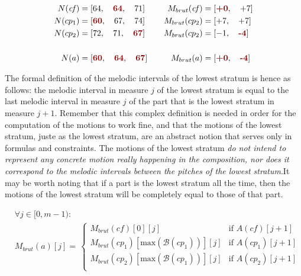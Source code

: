 \begin{equation}
    \begin{aligned}        
    N(\mathit{cf}) &= [64,\quad  \textcolor{darkred}{\textbf{64}},\quad  71] \quad 
    &M_{brut}(\mathit{cf}) &= [\textcolor{darkred}{\textbf{+0}}, \quad +7]\\
    N(cp_1) &= [\textcolor{darkred}{\textbf{60}},\quad  67,\quad  74] \quad 
    &M_{brut}(cp_2) &= [+7, \quad +7]\\
    N(cp_2) &= [72,\quad  71,\quad  \textcolor{darkred}{\textbf{67}}] \quad 
    &M_{brut}(cp_2) &= [-1, \quad \textcolor{darkred}{\textbf{-4}}]\\
    \\
    N(a) &= [\textcolor{darkred}{\textbf{60}},\quad  \textcolor{darkred}{\textbf{64}},\quad  \textcolor{darkred}{\textbf{67}}] \quad 
    &M_{brut}(a) &= [\textcolor{darkred}{\textbf{+0}}, \quad \textcolor{darkred}{\textbf{-4}}]\\
\end{aligned}
\label{eq:defining-m-intervals-bass}
\end{equation}


The formal definition of the melodic intervals of the lowest stratum is hence as follows: the melodic interval in measure $j$ of the lowest stratum is equal to the last melodic interval in measure $j$ of the part that is the lowest stratum in measure $j+1$. Remember that this complex definition is needed in order for the computation of the motions to work fine, and that the motions of the lowest stratum, juste as the lowest stratum, are an abstract notion that serves only in formulas and constraints. The motions of the lowest stratum \textit{do not intend to represent any concrete motion really happening in the composition, nor does it correspond to the melodic intervals between the pitches of the lowest stratum}.It may be worth noting that if a part is the lowest stratum all the time, then the motions of the lowest stratum will be completely equal to those of that part.

\begin{equation}
    \begin{aligned}
        &\forall j \in [0, m-1):\\
        &M_{brut}(a)[j] = \,  
        \begin{cases}
            M_{brut}(\mathit{cf})[0][j] & \text{if } A(\mathit{cf})[j+1]\\
            M_{brut}(cp_1)[\text{max}(\mathcal{B}(cp_1))][j] & \text{if } A(cp_1)[j+1]\\
            M_{brut}(cp_2)[\text{max}(\mathcal{B}(cp_1))][j] & \text{if } A(cp_2)[j+1]\\
        \end{cases}
    \end{aligned}
\end{equation}

